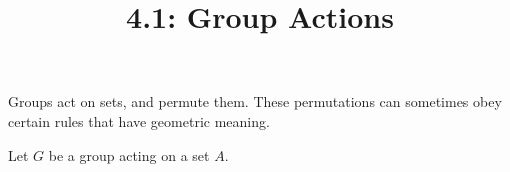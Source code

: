 \documentclass{article}
\title{4.1: Group Actions}
\begin{document}
\maketitle

\begin{definition}
Groups act on sets, and permute them. These permutations can sometimes obey certain rules that have geometric meaning. 

Let $G$ be a group acting on a set $A$. 
\end{definition}
\end{document}
